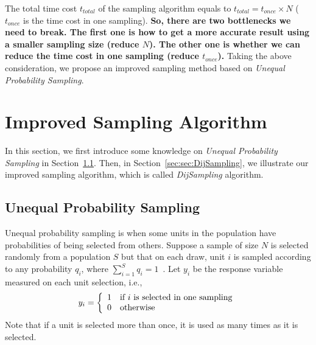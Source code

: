 \documentclass[runningheads,a4paper]{llncs}
\begin{document}
The total time cost $t_{total}$ of the sampling algorithm equals to $t_{total}=t_{once}\times N$ ($t_{once}$ is the time cost in one sampling). \textbf{So, there are two bottlenecks we need to break. The first one is how to get a more accurate result using a smaller sampling size (reduce $N$). The other one is whether we can reduce the time cost in one sampling (reduce $t_{once}$).} Taking the above consideration, we propose an improved sampling method based on \emph{Unequal Probability Sampling}.

\vspace{-0.4cm}
\section{Improved Sampling Algorithm}
\label{sec:impro-samp}
\vspace{-0.2cm}

In this section, we first introduce some knowledge on \emph{Unequal Probability Sampling} in Section~\ref{sec:sec:unequl-pro-samp}. Then, in Section~\ref{sec:sec:DijSampling}, we illustrate our improved sampling algorithm, which is called \emph{DijSampling} algorithm.

\vspace{-0.4cm}
\subsection{Unequal Probability Sampling}
\label{sec:sec:unequl-pro-samp}

\vspace{-0.2cm}
Unequal probability sampling is when some units in the population have probabilities of being selected from others. Suppose a sample of size $N$ is selected randomly from a population $S$ but that on each draw, unit $i$ is sampled according to any probability $q_i$, where $\sum_{i=1}^{S}q_i=1$~\cite{Sampling3rd}. Let $y_i$ be the response variable measured on each unit selection, i.e.,
\vspace{-0.2cm}
\[
y_i=\left\{ \begin{array}{ll}
1 & \textrm{if $i$ is selected in one sampling}\\
0 & \textrm{otherwise}
\end{array} \right.
\vspace{-0.2cm}
\]
Note that if a unit is selected more than once, it is used as many times as it is selected.
\end{document}
